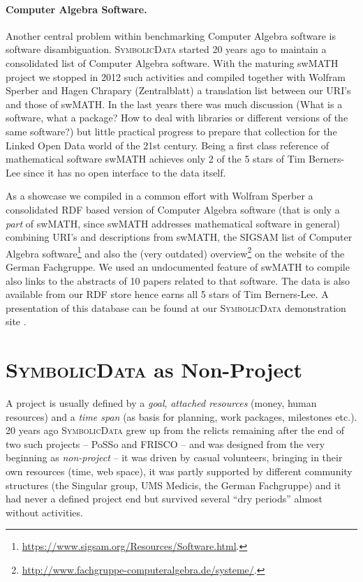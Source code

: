 \documentclass[a4paper,11pt]{article}
\def\SD{\textsc{SymbolicData}}
\begin{document}
\paragraph{Computer Algebra Software.}
Another central problem within benchmarking Computer Algebra software is
software disambiguation. {\SD} started 20 years ago to maintain a consolidated
list of Computer Algebra software. With the maturing swMATH project
\cite{swmath} we stopped in 2012 such activities and compiled together with
Wolfram Sperber and Hagen Chrapary (Zentralblatt) a translation list between
our URI's and those of swMATH. In the last years there was much discussion
(What is a software, what a package? How to deal with libraries or different
versions of the same software?)  but little practical progress to prepare that
collection for the Linked Open Data world of the 21st century. Being a first
class reference of mathematical software swMATH achieves only 2 of the 5 stars
of Tim Berners-Lee since it has no open interface to the data itself.

As a showcase we compiled in a common effort with Wolfram Sperber a
consolidated RDF based version of Computer Algebra software (that is only a
\emph{part} of swMATH, since swMATH addresses mathematical software in general)
combining URI's and descriptions from swMATH, the SIGSAM list of Computer
Algebra
software\footnote{\url{https://www.sigsam.org/Resources/Software.html}.} and
also the (very outdated)
overview\footnote{\url{http://www.fachgruppe-computeralgebra.de/systeme/}.} on
the website of the German Fachgruppe.  We used an undocumented feature of
swMATH to compile also links to the abstracts of 10 papers related to that
software.  The data is also available from our RDF store hence earns all 5
stars of Tim Berners-Lee.  A presentation of this database can be found at our
{\SD} demonstration site \cite{sdinfo}.

\section{{\SD} as Non-Project}

A project is usually defined by a \emph{goal}, \emph{attached resources}
(money, human resources) and a \emph{time span} (as basis for planning, work
packages, milestones etc.).  20 years ago {\SD} grew up from the relicts
remaining after the end of two such projects -- PoSSo and FRISCO -- and was
designed from the very beginning as \emph{non-project} -- it was driven by
casual volunteers, bringing in their own resources (time, web space), it was
partly supported by different community structures (the Singular group, UMS
Medicis, the German Fachgruppe) and it had never a defined project end but
survived several ``dry periods'' almost without activities.
\end{document}
